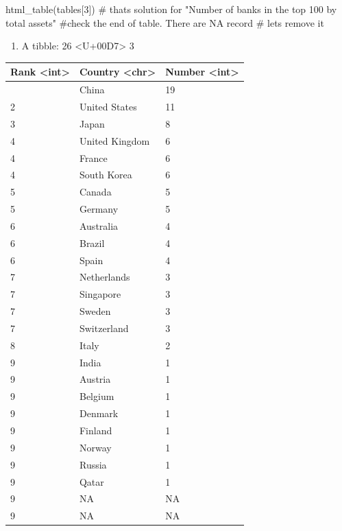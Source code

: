\documentclass[
  letterpaper,
  DIV=11,
  numbers=noendperiod]{scrreprt}
\newenvironment{Shaded}{\begin{snugshade}}{\end{snugshade}}
\newcommand{\CommentTok}[1]{\textcolor[rgb]{0.37,0.37,0.37}{#1}}
\newcommand{\DecValTok}[1]{\textcolor[rgb]{0.68,0.00,0.00}{#1}}
\newcommand{\FunctionTok}[1]{\textcolor[rgb]{0.28,0.35,0.67}{#1}}
\newcommand{\NormalTok}[1]{\textcolor[rgb]{0.00,0.23,0.31}{#1}}
\providecommand{\tightlist}{%
  \setlength{\itemsep}{0pt}\setlength{\parskip}{0pt}}\usepackage{longtable,booktabs,array}
\begin{document}
\begin{Shaded}
\begin{Highlighting}[]
\FunctionTok{html\_table}\NormalTok{(tables[}\DecValTok{3}\NormalTok{]) }\CommentTok{\# thats solution for "Number of banks in the top 100 by total assets"}
\CommentTok{\#check the end of table. There are NA record}
\CommentTok{\# lets remove it}
\end{Highlighting}
\end{Shaded}

\begin{enumerate}
\def\labelenumi{\arabic{enumi}.}
\tightlist
\item
  A tibble: 26 \textless U+00D7\textgreater{} 3
\end{enumerate}

\begin{longtable}[]{@{}lll@{}}
\toprule\noalign{}
Rank \textless int\textgreater{} & Country \textless chr\textgreater{} &
Number \textless int\textgreater{} \\
\midrule\noalign{}
\endhead
\bottomrule\noalign{}
\endlastfoot
1 & China & 19 \\
2 & United States & 11 \\
3 & Japan & 8 \\
4 & United Kingdom & 6 \\
4 & France & 6 \\
4 & South Korea & 6 \\
5 & Canada & 5 \\
5 & Germany & 5 \\
6 & Australia & 4 \\
6 & Brazil & 4 \\
6 & Spain & 4 \\
7 & Netherlands & 3 \\
7 & Singapore & 3 \\
7 & Sweden & 3 \\
7 & Switzerland & 3 \\
8 & Italy & 2 \\
9 & India & 1 \\
9 & Austria & 1 \\
9 & Belgium & 1 \\
9 & Denmark & 1 \\
9 & Finland & 1 \\
9 & Norway & 1 \\
9 & Russia & 1 \\
9 & Qatar & 1 \\
9 & NA & NA \\
9 & NA & NA \\
\end{longtable}
\end{document}
